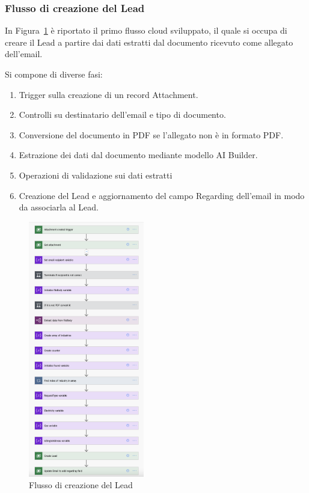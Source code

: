\subsubsection{Flusso di creazione del Lead}
In Figura~\ref{fig:flussoCreazioneLead} è riportato il primo flusso cloud sviluppato, il quale si occupa di creare il Lead a partire dai dati estratti dal documento ricevuto come allegato dell'email.

Si compone di diverse fasi:
\begin{enumerate}
  \item Trigger sulla creazione di un record Attachment.
  \item Controlli su destinatario dell'email e tipo di documento.
  \item Conversione del documento in PDF se l'allegato non è in formato PDF.
  \item Estrazione dei dati dal documento mediante modello AI Builder.
  \item Operazioni di validazione sui dati estratti
  \item Creazione del Lead e aggiornamento del campo Regarding dell'email in modo da associarla al Lead.
\end{enumerate}

\begin{figure}[ht!]
  \centering
  \includegraphics[width=0.45\textwidth]{flusso1.png}
  \caption{Flusso di creazione del Lead}
  \label{fig:flussoCreazioneLead}
\end{figure}

